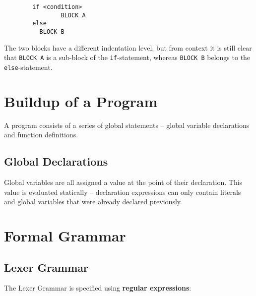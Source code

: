 \documentclass{article}
\newcommand{\code}[1]{\lstinline[columns=fixed]{#1}}
\begin{document}
		\begin{lstlisting}
		if <condition>
				BLOCK A
		else
		  BLOCK B
		\end{lstlisting}
		
		The two blocks have a different indentation level, but from context it is still clear that \code{BLOCK A} is a sub-block of the \code{if}-statement, whereas \code{BLOCK B} belongs to the \code{else}-statement.
		
	\section{Buildup of a Program}
	
		A program consists of a series of global statements -- global variable declarations and function definitions.
		
		\subsection{Global Declarations}
		
			Global variables are all assigned a value at the point of their declaration. This value is evaluated statically -- declaration expressions can only contain literals and global variables that were already declared previously.
		
	\section{Formal Grammar}
	
		\subsection{Lexer Grammar}
		
			The Lexer Grammar is specified using \textbf{regular expressions}:
			
\end{document}
